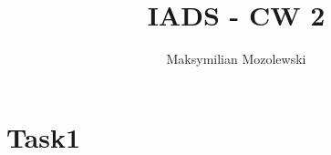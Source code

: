 \documentclass{report}
\begin{document}
\title{IADS - CW 2}
\author{Maksymilian Mozolewski}
\maketitle
\pagebreak
\section{Task1}

\end{document}
